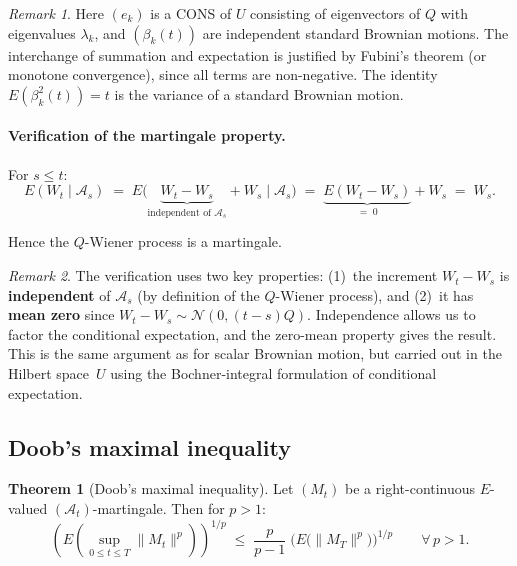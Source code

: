 \documentclass[11pt]{article}
\theoremstyle{definition}
\newtheorem{theorem}{Theorem}
\theoremstyle{remark}
\newtheorem{remark}{Remark}
\begin{document}
\begin{remark}
Here $(e_k)$ is a CONS of $U$ consisting of eigenvectors of $Q$
with eigenvalues $\lambda_k$, and $(\beta_k(t))$ are independent
standard Brownian motions.
The interchange of summation and expectation is justified by
Fubini's theorem (or monotone convergence), since all terms
are non-negative.  The identity
$E(\beta_k^2(t)) = t$ is the variance of a standard Brownian motion.
\end{remark}

\paragraph{Verification of the martingale property.}

For $s \le t$:
\[
    E(W_t \mid \mathcal{A}_s)
    \;=\;
    E\!\bigl(\underbrace{W_t - W_s}_{\text{independent of } \mathcal{A}_s}
    + W_s \;\big|\; \mathcal{A}_s\bigr)
    \;=\;
    \underbrace{E(W_t - W_s)}_{=\;0}
    + W_s
    \;=\;
    W_s.
\]

Hence the $Q$-Wiener process is a martingale.

\begin{remark}
The verification uses two key properties: (1)~the increment $W_t - W_s$ is \textbf{independent} of $\mathcal{A}_s$ (by definition of the $Q$-Wiener process), and (2)~it has \textbf{mean zero} since $W_t - W_s \sim \mathcal{N}(0, (t-s)Q)$.  Independence allows us to factor the conditional expectation, and the zero-mean property gives the result.  This is the same argument as for scalar Brownian motion, but carried out in the Hilbert space~$U$ using the Bochner-integral formulation of conditional expectation.
\end{remark}

\subsection*{Doob's maximal inequality}

\begin{theorem}[Doob's maximal inequality]
Let $(M_t)$ be a right-continuous $E$-valued
$(\mathcal{A}_t)$-martingale.  Then for $p > 1$:
\[
    \left(
        E\!\left(\sup_{0 \le t \le T} \|M_t\|^p\right)
    \right)^{1/p}
    \;\le\;
    \frac{p}{p-1}\;
    \bigl(E\!\bigl(\|M_T\|^p\bigr)\bigr)^{1/p}
    \qquad \forall\, p > 1.
\]
\end{theorem}
\end{document}
